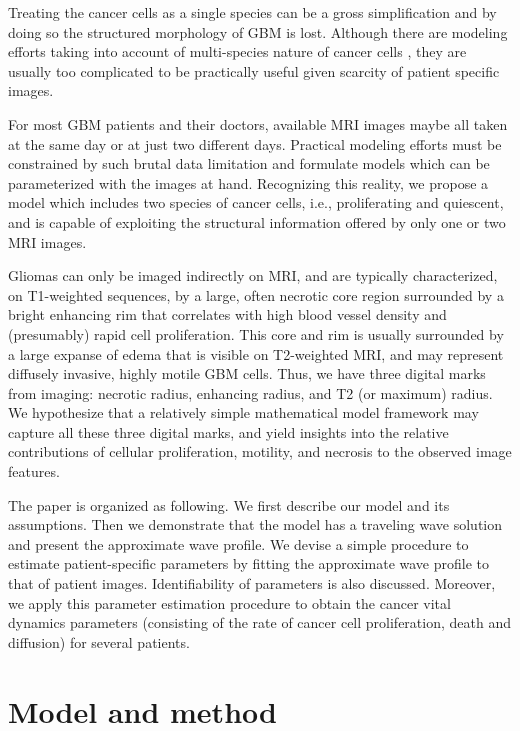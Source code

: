 \documentclass{aims}
\numberwithin{equation}{section}
\begin{document}
Treating the cancer cells as a single species can be a gross simplification and
by doing so the structured morphology of GBM is lost. Although there are modeling 
efforts taking into account of multi-species nature of cancer cells \cite{Eikenberry2009,Swanson2011}, they are usually too complicated to be 
practically useful given scarcity of patient specific images. 

For most GBM patients and their doctors, available MRI images maybe all taken
at the same day or at just two different days. Practical modeling efforts must be constrained by such brutal data limitation and formulate models which can be parameterized with the images at hand. Recognizing this reality, we propose a model 
which includes two species of cancer cells, i.e., proliferating and quiescent,
and is capable of exploiting the structural information offered by only
one or two MRI images. 

Gliomas can only be imaged indirectly on MRI, and are typically characterized,
on T1-weighted sequences, by a large, often necrotic core region surrounded
by a bright enhancing rim that correlates with high blood vessel density
and (presumably) rapid cell proliferation. This core and
rim is usually surrounded by a large expanse of edema that is visible
on T2-weighted MRI, and may represent diffusely invasive, highly motile
GBM cells. Thus, we have three digital marks from imaging: necrotic radius,
enhancing radius, and T2 (or maximum) radius. We hypothesize that a relatively 
simple mathematical model framework may capture all these three
digital marks, and yield insights into the relative contributions of cellular
proliferation, motility, and necrosis to the observed image features.

The paper is organized as following. We first describe our model and
its assumptions. Then we demonstrate that the model has a traveling
wave solution and present the approximate wave profile. We devise
a simple procedure to estimate patient-specific parameters by fitting the approximate
wave profile to that of patient images. Identifiability of parameters is also 
discussed. Moreover, we apply this parameter estimation procedure to 
obtain the cancer vital dynamics parameters (consisting of the rate of cancer cell proliferation, death and diffusion) for several patients.  



\section{Model and method}
\end{document}
